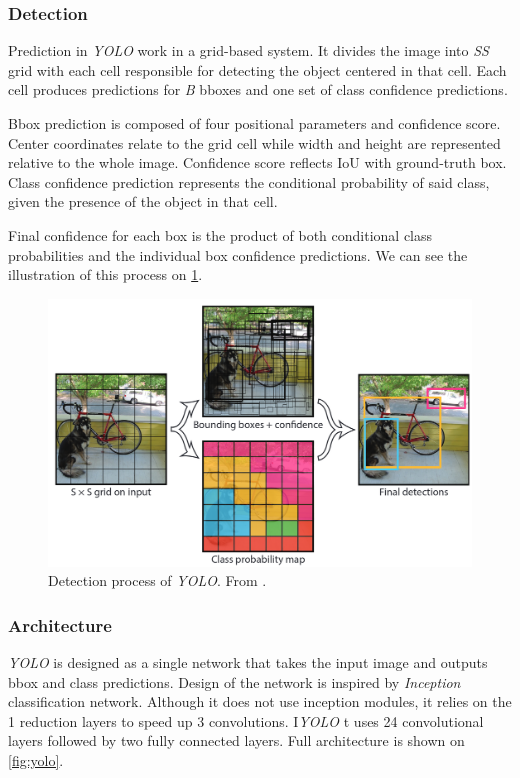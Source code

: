 \subsubsection{Detection}
Prediction in \textit{YOLO} work in a grid-based system. It divides the image into \textit{S\x S} grid with each cell responsible for detecting the object centered in that cell.  Each cell produces predictions for \textit{B} bboxes and one set of class confidence predictions. 

Bbox prediction is composed of four positional parameters and confidence score. Center coordinates relate to the grid cell while width and height are represented relative to the whole image. Confidence score reflects IoU with ground-truth box. Class confidence prediction represents the conditional probability of said class, given the presence of the object in that cell. 

Final confidence for each box is the product of both conditional class probabilities and the individual box confidence predictions. We can see the illustration of this process on \cref{fig:yoloDet}.

\begin{figure}
    \centering
    \includegraphics[width=\textwidth]{img/yoloDet}
    \caption{Detection process of \textit{YOLO}. From \cite[fig. 2]{bib:yolo}.}
    \label{fig:yoloDet} 
\end{figure}


\subsubsection{Architecture} 
\textit{YOLO} is designed as a single network that takes the input image and outputs bbox and class predictions. Design of the network is inspired by \textit{Inception} classification network. Although it does not use inception modules, it relies on the 1 reduction layers to speed up 3 convolutions. I\textit{YOLO} t uses 24 convolutional layers followed by two fully connected layers. Full architecture is shown on \cref{fig:yolo}. 

